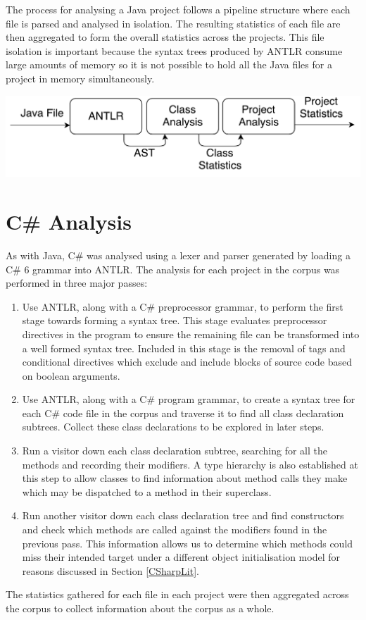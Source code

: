 The process for analysing a Java project follows a pipeline structure where each file is parsed and analysed in isolation. The resulting statistics of each file are then aggregated to form the overall statistics across the projects. This file isolation is important because the syntax trees produced by ANTLR consume large amounts of memory so it is not possible to hold all the Java files for a project in memory simultaneously.
\newline

\begin{center}
	\includegraphics[scale=0.70]{AntlrPipeline.pdf}
\end{center}

\section{C\# Analysis}
As with Java, C\# was analysed using a lexer and parser generated by loading a C\# 6 grammar into ANTLR. The analysis for each project in the corpus was performed in three major passes:
\begin{enumerate}
	\item Use ANTLR, along with a C\# preprocessor grammar, to perform the first stage towards forming a syntax tree. This stage evaluates preprocessor directives in the program to ensure the remaining file can be transformed into a well formed syntax tree. Included in this stage is the removal of  tags and conditional directives which exclude and include blocks of source code based on boolean arguments.
	
	\item Use ANTLR, along with a C\# program grammar, to create a syntax tree for each C\# code file in the corpus and traverse it to find all class declaration subtrees. Collect these class declarations to be explored in later steps.
	
	\item Run a visitor down each class declaration subtree, searching for all the methods and recording their modifiers. A type hierarchy is also established at this step to allow classes to find information about method calls they make which may be dispatched to a method in their superclass.
	
	\item Run another visitor down each class declaration tree and find constructors and check which methods are called against the modifiers found in the previous pass. This information allows us to determine which methods could miss their intended target under a different object initialisation model for reasons discussed in Section \ref{CSharpLit}.
\end{enumerate}
The statistics gathered for each file in each project were then aggregated across the corpus to collect information about the corpus as a whole.

